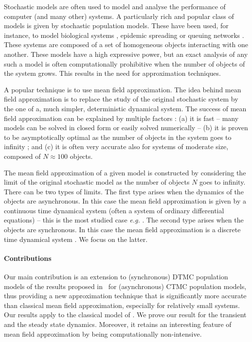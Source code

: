 \documentclass[review]{elsarticle}
\begin{document}
Stochastic models are often used to model and analyse the performance
of computer (and many other) systems. A particularly rich and popular
class of models is given by stochastic population models. These have
been used, for instance, to model biological systems
\cite{wilkinson2006}, epidemic spreading \cite{andersson2000} or
queuing networks \cite{vvedenskaya1996queueing}. These systems are
composed of a set of homogeneous objects interacting with one
another. These models have a high expressive power, but an exact
analysis of any such a model is often computationally prohibitive when
the number of objects of the system grows. This results in the need
for approximation techniques.

A popular technique is to use mean field approximation. The idea
behind mean field approximation is to replace the study of the
original stochastic system by the one of a, much simpler,
deterministic dynamical system.  The success of mean field
approximation can be explained by multiple factors : (a) it is fast --
many models can be solved in closed form
\cite{vvedenskaya1996queueing,mitzenmacher2001power,tsitsiklis2011power,minnebo2}
or easily solved numerically
\cite{massoulie1,gast2010mean,van2013mean} -- (b) it is proven to be
asymptotically optimal as the number of objects in the system goes to
infinity
\cite{kurtz70,Le+07,benaim2008class,gast2012markov,BHLM13};
and (c) it is often very accurate also for systems of moderate size,
composed of $N\approx100$ objects.

The mean field approximation of a given model is constructed by
considering the limit of the original stochastic model as the number
of objects $N$ goes to infinity. There can be two types of limits. The
first type arises when the dynamics of the objects are
asynchronous. In this case the mean field approximation is given by a
continuous time dynamical system (often a system of ordinary
differential equations) -- this is the most studied case \emph{e.g.}
\cite{kurtz70,benaim2008class,BHLM13}.  The second
type arises when the objects are synchronous. In this case
the mean field approximation is a discrete time dynamical system
\cite{Le+07,gastgaujalDEDS,tinnakornsrisuphap2003limit}. We focus on
the latter.

\paragraph*{Contributions}
Our main contribution is an extension to (synchronous) DTMC population models of the results 
proposed in~\cite{gast2017refined} for (asynchronous) CTMC population models, thus providing a new approximation technique that is significantly more accurate than classical mean field approximation, especially for relatively small systems.
Our results apply to the classical model of
\cite{Le+07,gastgaujalDEDS,latella2013fly}. We prove our result for
the transient and the steady state dynamics. Moreover, it retains an
interesting feature of mean field approximation by being
computationally non-intensive.
\end{document}

